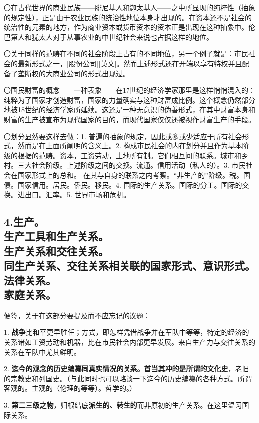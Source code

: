\documentclass[a4paper,twoside,12pt]{ctexart}
\begin{document}
〇在古代世界的商业民族——腓尼基人和迦太基人——之中所显现的纯粹性（抽象的规定性），正是由于农业民族的统治性地位本身才出现的。在资本还不是社会的统治性的元素的地方，作为商业资本或货币资本的资本正是出现在这种抽象中。伦巴第人和犹太人对于从事农业的中世纪社会来说也占据这样的地位。

〇关于同样的范畴在不同的社会阶段上占有的不同地位，另一个例子就是：市民社会的最新形式之一，[股份公司][英文]。然而上述形式还在开端以享有特权并且配备了垄断权的大商业公司的形式出现过。

〇国民财富的概念——一种表象——在17世纪的经济学家那里是这样悄悄混入的：纯粹为了国家才创造财富，国家的力量确实与这种财富成比例。这个概念仍然部分地被18世纪的经济学家所延续。这还是一种无意识的伪善形式，在其中财富本身和财富的生产被宣布为现代国家的目的，而现代国家仅仅还被视作财富生产的手段。

〇划分显然要这样去做：1. 普遍的抽象的规定，因此或多或少适应于所有社会形式，然而是在上面所阐明的含义上。2. 构成市民社会的内在划分并且作为基本阶级的根据的范畴。资本，工资劳动，土地所有制。它们相互间的联系。城市和乡村。三大社会阶级。上述阶级之间的交换。流通。信用活动（私人的）。3. 市民社会在国家形式上的总和。 在其与自身的联系之内考察。“非生产的”阶级。税。国债。国家信用。居民。侨民。移民。4. 国际的生产关系。国际的分工。国际的交换。进出口。汇率。5. 世界市场和危机。

\newpage

\subsection{4.生产。\\生产工具和生产关系。\\生产关系和交往关系。\\同生产关系、交往关系相关联的国家形式、意识形式。\\法律关系。\\家庭关系。}

便签，关于在这部分要提及而不应忘记的议题：

1. \textbf{战争}比和平更早胜任；方式，即怎样凭借战争并在军队中等等，特定的经济的关系诸如工资劳动和机器，比在市民社会内部更早发展。来自生产力与交往关系的关系在军队中尤其鲜明。

2. \textbf{迄今的观念的历史编纂同真实情况的关系。首当其冲的是所谓的文化史}，老旧的宗教史和列国史。（与此同时也可以略谈一下迄今的历史编纂的各种方式。所谓客观的。主观的（伦理的等等）。哲学的。）

3. \textbf{第二三级之物}，归根结底\textbf{派生的、转生的}而非原初的生产关系。在这里温习国际关系。
\end{document}
